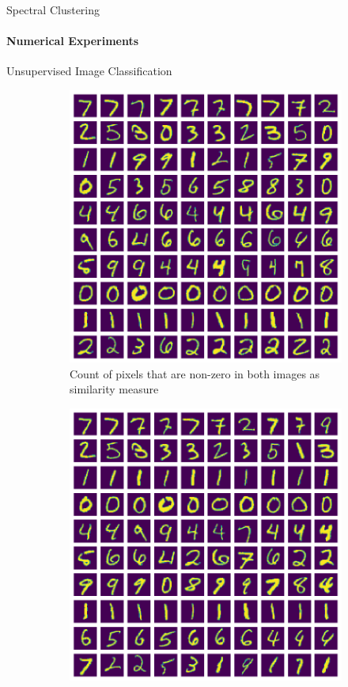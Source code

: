 \documentclass[10pt,a4paper, nocenter]{beamer}
\begin{document}
	\begin{frame}{Spectral Clustering}
		\framesubtitle{Numerical Experiments}
		Unsupervised Image Classification
        \begin{figure}[h]
			\begin{center}
				\begin{subfigure}[b]{0.3\textwidth}
					\centering
					\includegraphics[width=\textwidth]{../../images/number_clustering_10_0norm.png}
					\caption{Count of pixels that are non-zero in both images as similarity measure}
					\label{fig:clustering_10_0norm}
				\end{subfigure}           
				\begin{subfigure}[b]{0.3\textwidth}
					\centering
					\includegraphics[width=\textwidth]{../../images/number_clustering_10_2norm.png}

\end{subfigure}
\end{center}
\end{figure}
\end{frame}
\end{document}
